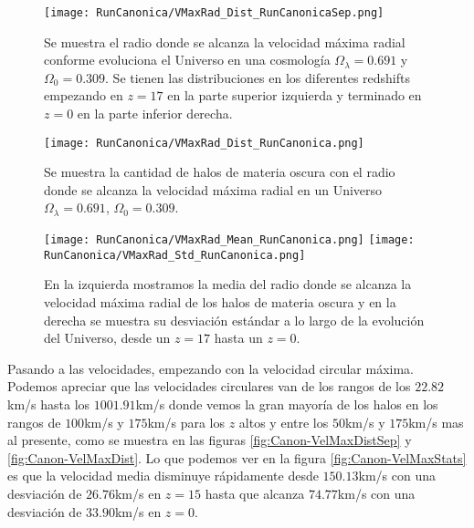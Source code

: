 \begin{figure}[H]
    \centering
    \texttt{[image: RunCanonica/VMaxRad\_Dist\_RunCanonicaSep.png]}
    \caption[Radio donde se alcanza la velocidad máxima radial en la evolución de un Universo $\Omega_\lambda = 0.691 $, $\Omega_0 = 0.309$]{\footnotesize Se muestra el radio donde se alcanza la velocidad máxima radial conforme evoluciona el Universo en una cosmología $\Omega_\lambda = 0.691 $ y $\Omega_0 = 0.309$. Se tienen las distribuciones en los diferentes redshifts empezando en $z=17$ en la parte superior izquierda y terminado en $z=0$ en la parte inferior derecha.}
    \label{fig:Canon-VMaxRadDistSep}
\end{figure}

\begin{figure}[H]
    \centering
    \texttt{[image: RunCanonica/VMaxRad\_Dist\_RunCanonica.png]}
    \caption[Distribución del radio donde se alcanza la velocidad máxima radial de un Universo $\Omega_\lambda = 0.691 $, $\Omega_0 = 0.309$]{\footnotesize Se muestra la cantidad de halos de materia oscura con el radio donde se alcanza la velocidad máxima radial en un Universo $\Omega_\lambda = 0.691 $, $\Omega_0 = 0.309$.}
    \label{fig:Canon-VMaxRadDist}
\end{figure}

\begin{figure}[H]
    \centering
    \texttt{[image: RunCanonica/VMaxRad\_Mean\_RunCanonica.png]}
    \texttt{[image: RunCanonica/VMaxRad\_Std\_RunCanonica.png]}
    \caption[Media y desviación estándar del Radio donde se alcanza la velocidad máxima radial de un Universo $\Omega_\lambda = 0.691 $, $\Omega_0 = 0.309$]{\footnotesize En la izquierda mostramos la media del radio donde se alcanza la velocidad máxima radial de los halos de materia oscura y en la derecha se muestra su desviación estándar a lo largo de la evolución del Universo, desde un $z=17$ hasta un $z=0$.}
    \label{fig:Canon-VMaxRadStats}
\end{figure}

Pasando a las velocidades, empezando con la velocidad circular máxima. Podemos apreciar que las velocidades circulares van de los rangos de los $22.82$km/s hasta los $1001.91$km/s donde vemos la gran mayoría de los halos en los rangos de $100$km/s y $175$km/s para los $z$ altos y entre los $50$km/s y $175$km/s mas al presente, como se muestra en las figuras \ref{fig:Canon-VelMaxDistSep} y \ref{fig:Canon-VelMaxDist}. Lo que podemos ver en la figura \ref{fig:Canon-VelMaxStats} es que la velocidad  media disminuye rápidamente desde $150.13$km/s con una desviación de $26.76$km/s en $z=15$ hasta que alcanza $74.77$km/s con una desviación de $33.90$km/s en $z=0$.

